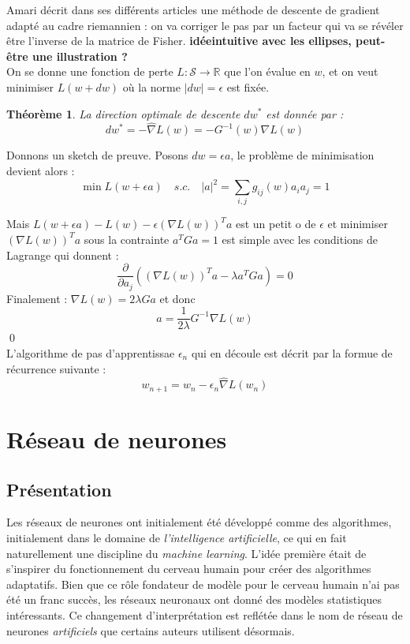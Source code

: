 \documentclass{article}
\newtheorem{thm}{Théorème}
\newcommand{\R}{\mathbb R}
\begin{document}
Amari décrit dans ses différents articles une méthode de descente de gradient adapté au cadre riemannien : on va corriger le pas par un facteur qui va se révéler être l'inverse de la matrice de Fisher. \textbf{idéeintuitive avec les ellipses, peut-être une illustration ?}\\

 On se donne une fonction de perte $L : \mathcal S \rightarrow \R$ que l'on évalue en $w$, et on veut minimiser $L(w+dw)$ où la norme $|dw|=\epsilon$ est fixée. 

\begin{thm}
La direction optimale de descente $dw^*$ est donnée par :
\[dw^*= -\hat{\nabla}L(w)=-G^{-1}(w) \nabla L(w)\]
\end{thm}

Donnons un sketch de preuve. Posons $dw= \epsilon a $, le problème de minimisation devient alors :
\[\min L(w+\epsilon a) \quad s.c. \quad |a|^2=\sum_{i,j} g_{ij}(w)a_i a_j=1\]

Mais $L(w+\epsilon a) - L(w)-\epsilon (\nabla L(w))^T a $ est un petit o de $\epsilon$ et minimiser $(\nabla L(w))^T a$ sous la contrainte $a^T G a = 1$ est simple avec les conditions de Lagrange qui donnent :
\[\frac{\partial}{\partial a_j}((\nabla L(w))^T a - \lambda a^T G a )=0\]
Finalement : $\nabla L(w) = 2\lambda Ga$ et donc 
\[a=\frac{1}{2\lambda}G^{-1}\nabla L(w)\] \qed\\

L'algorithme de pas d'apprentissae $\epsilon_n$ qui en découle est décrit par la formue de récurrence suivante :
\[w_{n+1}=w_n -\epsilon_n \hat{\nabla} L(w_n)\] 

\section{Réseau de neurones}

\subsection{Présentation}

Les réseaux de neurones ont initialement été développé comme des algorithmes, initialement dans le domaine de \textit{l'intelligence artificielle}, ce qui en fait naturellement une discipline du \textit{machine learning}. L'idée première était de s'inspirer du fonctionnement du cerveau humain pour créer des algorithmes adaptatifs. Bien que ce rôle fondateur de modèle pour le cerveau humain n'ai pas été un franc succès, les réseaux neuronaux ont donné des modèles statistiques intéressants. Ce changement d'interprétation est reflétée dans le nom de réseau de neurones \textit{artificiels} que certains auteurs utilisent désormais. \\
\end{document}
